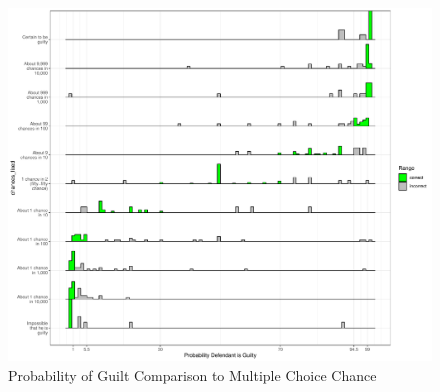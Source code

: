 \documentclass[print]{nuthesis}
\begin{document}
\begin{figure}

{\centering \includegraphics[width=\linewidth]{thesis_files/figure-latex/probchancescale1-1} 

}

\caption{Probability of Guilt Comparison to Multiple Choice Chance}\label{fig:probchancescale1}
\end{figure}
\end{document}
